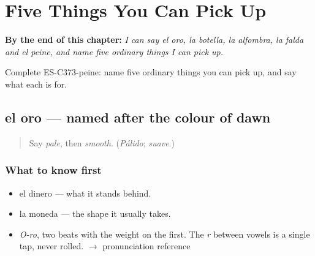 
\chapter{Five Things You Can Pick Up}
\label{ch:el-oro-y-la-botella}

\begin{chapteropening}
\textbf{By the end of this chapter:} \emph{I can say el oro, la botella, la alfombra, la falda and el peine, and name five ordinary things I can pick up.}

Complete ES-C373-peine: name five ordinary things you can pick up, and say what each is for.
\end{chapteropening}

\section[el oro]{el oro — named after the colour of dawn}

\label{lesson:ES-C373-oro}



\begin{quote}
Say \emph{pale}, then \emph{smooth}. (\emph{Pálido}; \emph{suave}.)
\end{quote}

\subsection*{What to know first}
\begin{itemize}
\raggedright
  \item el dinero — what it stands behind.
  \item la moneda — the shape it usually takes.
\end{itemize}

\begin{sounds}
\begin{itemize}
\raggedright
  \item \emph{O-ro}, two beats with the weight on the first. The \emph{r} between vowels is a single tap, never rolled. $\to$ pronunciation reference
\end{itemize}
\end{sounds}

